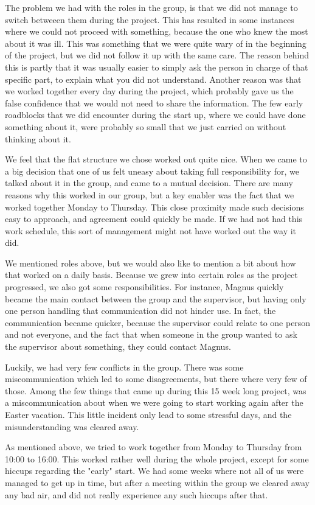 The problem we had with the roles in the group, is that we did not manage to switch betweeen them during the project. This has resulted in some instances where we could not proceed with something, because the one who knew the most about it was ill. This was something that we were quite wary of in the beginning of the project, but we did not follow it up with the same care. The reason behind this is partly that it was usually easier to simply ask the person in charge of that specific part, to explain what you did not understand. Another reason was that we worked together every day during the project, which probably gave us the false confidence that we would not need to share the information. The few early roadblocks that we did encounter during the start up, where we could have done something about it, were probably so small that we just carried on without thinking about it.

We feel that the flat structure we chose worked out quite nice. When we came to a big decision that one of us felt uneasy about taking full responsibility for, we talked about it in the group, and came to a mutual decision. There are many reasons why this worked in our group, but a key enabler was the fact that we worked together Monday to Thursday. This close proximity made such decisions easy to approach, and agreement could quickly be made. If we had not had this work schedule, this sort of management might not have worked out the way it did.

We mentioned roles above, but we would also like to mention a bit about how that worked on a daily basis. Because we grew into certain roles as the project progressed, we also got some responsibilities. For instance, Magnus quickly became the main contact between the group and the supervisor, but having only one person handling that communication did not hinder use. In fact, the communication became quicker, because the supervisor could relate to one person and not everyone, and the fact that when someone in the group wanted to ask the supervisor about something, they could contact Magnus.

Luckily, we had very few conflicts in the group. There was some miscommunication which led to some disagreements, but there where very few of those. Among the few things that came up during this 15 week long project, was a miscommunication about when we were going to start working again after the Easter vacation. This little incident only lead to some stressful days, and the misunderstanding was cleared away.

As mentioned above, we tried to work together from Monday to Thursday from 10:00 to 16:00. This worked rather well during the whole project, except for some hiccups regarding the "early" start. We had some weeks where not all of us were managed to get up in time, but after a meeting within the group we cleared away any bad air, and did not really experience any such hiccups after that.
